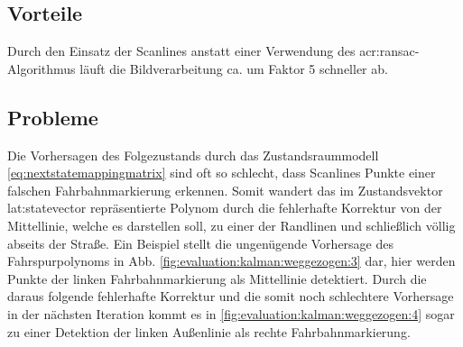 \subsection{Vorteile}
\label{ssec:polynombasierte:kalman:vorteile}
Durch den Einsatz der Scanlines anstatt einer Verwendung des \gls{acr:ransac}-Algorithmus 
läuft die Bildverarbeitung ca. um Faktor 5 schneller ab.

\subsection{Probleme}
\label{ssec:polynombasierte:kalman:probleme}
Die Vorhersagen des Folgezustands durch das Zustandsraummodell \eqref{eq:nextstatemappingmatrix} sind oft so schlecht, dass Scanlines Punkte einer falschen Fahrbahnmarkierung erkennen. Somit \glqq wandert\grqq{} das im Zustandsvektor \gls{lat:statevector} repräsentierte Polynom durch die fehlerhafte Korrektur von der Mittellinie, welche es darstellen soll, zu einer der Randlinen und schließlich völlig abseits der Straße. Ein Beispiel stellt die ungenügende Vorhersage des Fahrspurpolynoms in Abb. \ref{fig:evaluation:kalman:weggezogen:3} dar, hier werden Punkte der linken Fahrbahnmarkierung als Mittellinie detektiert. Durch die daraus folgende fehlerhafte Korrektur und die somit noch schlechtere Vorhersage in der nächsten Iteration kommt es in \ref{fig:evaluation:kalman:weggezogen:4} sogar zu einer Detektion der linken Außenlinie als rechte Fahrbahnmarkierung.

